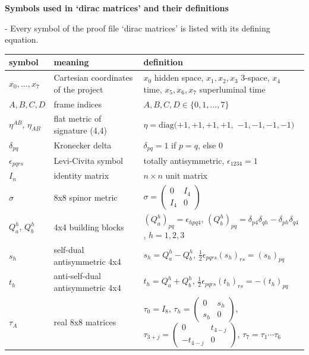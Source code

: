 \documentclass[10pt]{article}
\makeatletter
\newcommand\keepnext{\par\nopagebreak\@nobreaktrue\everypar{\@nobreakfalse\everypar{}}}
\newcommand\mdneed[1]{\par\if@nobreak\else\begingroup\setlength{\dimen@}{#1}\dimen@ii\pagegoal\advance\dimen@ii-\pagetotal
  \ifdim\dimen@>\dimen@ii\ifdim\dimen@ii>\z@\vfil\fi\break\fi\endgroup\fi}
\makeatother
\begin{document}
{\raggedright\LARGE\bfseries Symbols used in `dirac matrices' and their definitions\par}\medskip

\mdneed{6.4\baselineskip}Every symbol of the proof file `dirac matrices' is listed with its defining equation.\keepnext


{\small\begin{longtable}{>{\raggedright\arraybackslash}p{}>{\raggedright\arraybackslash}p{}>{\raggedright\arraybackslash}p{}}\toprule
symbol & meaning & definition \\\midrule\endhead
\bottomrule\endfoot
$x_0,\dots,x_7$ & Cartesian coordinates of the project & $x_0$ hidden space, $x_1,x_2,x_3$ 3-space, $x_4$ time, $x_5,x_6,x_7$ superluminal time \\
$A,B,C,D$ & frame indices & $A,B,C,D\in\{0,1,\dots,7\}$ \\
$\eta^{AB}$, $\eta_{AB}$ & flat metric of signature (4,4) & $\eta = \mathrm{diag}(+1,+1,+1,+1,$ $-1,-1,-1,-1)$ \\
$\delta_{pq}$ & Kronecker delta & $\delta_{pq} = 1$ if $p=q$, else 0 \\
$\epsilon_{pqrs}$ & Levi-Civita symbol & totally antisymmetric, $\epsilon_{1234}=1$ \\
$I_n$ & identity matrix & $n\times n$ unit matrix \\
$\sigma$ & 8x8 spinor metric & $\sigma = \begin{pmatrix}0&I_4\\ I_4&0\end{pmatrix}$ \\
$Q_a^h$, $Q_b^h$ & 4x4 building blocks & $(Q_a^h)_{pq} = \epsilon_{hpq4}$, $(Q_b^h)_{pq} = \delta_{p4}\delta_{qh} - \delta_{ph}\delta_{q4}$, $h=1,2,3$ \\
$s_h$ & self-dual antisymmetric 4x4 & $s_h = Q_a^h - Q_b^h$, $\tfrac12\epsilon_{pqrs}(s_h)_{rs} = (s_h)_{pq}$ \\
$t_h$ & anti-self-dual antisymmetric 4x4 & $t_h = Q_a^h + Q_b^h$, $\tfrac12\epsilon_{pqrs}(t_h)_{rs} = -(t_h)_{pq}$ \\
$\tau_A$ & real 8x8 matrices & $\tau_0 = I_8$, $\tau_h = \begin{pmatrix}0&s_h\\ s_h&0\end{pmatrix}$, $\tau_{3+j} = \begin{pmatrix}0&t_{4-j}\\ -t_{4-j}&0\end{pmatrix}$, $\tau_7=\tau_1\cdots\tau_6$ \\

\end{longtable}}
\end{document}

